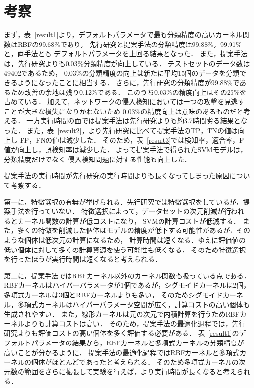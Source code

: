\section{考察}
まず，表~\ref{result1}より，デフォルトパラメータで最も分類精度の高いカーネル関数はRBFの99.68\%であり，
先行研究と提案手法の分類精度は99.88\%，99.91\%と，両手法とも
デフォルトパラメータを上回る結果となった．
また，提案手法は，先行研究よりも0.03\%分類精度が向上している．
テストセットのデータ数は49402であるため，
0.03\%の分類精度の向上は新たに平均15個のデータを分類できるようになったことに相当する．
さらに，先行研究の分類精度が99.88\%であるため改善の余地は残り0.12\%である．
このうち0.03\%の精度向上はその25\%を占めている．
加えて，ネットワークの侵入検知においては一つの攻撃を見逃すことが大きな損失になりかねないため
0.03\%の精度向上は意味のあるものだと考える．
一方実行時間の面では提案手法は先行研究よりも約3.7時間劣る結果となった．
また，表~\ref{result2}，より先行研究に比べて提案手法のTP，TNの値は向上し
FP，FNの値は減少した．
そのため，表~\ref{result3}では検知率，適合率，F値が向上し，誤検知率は減少した．
よって提案手法で得られたSVMモデルは，分類精度だけでなく
侵入検知問題に対する性能も向上した．

提案手法の実行時間が先行研究の実行時間よりも長くなってしまった原因について考察する．

第一に，特徴選択の有無が挙げられる．先行研究では特徴選択をしているが，提案手法を行っていない．
特徴選択によって，データセットの次元削減が行われるとカーネル関数の計算が低コストになり，
SVMの計算コストが低減する．
また，多くの特徴を削減した個体はモデルの精度が低下する可能性があるが，そのような個体は低次元の計算になるため，
計算時間は短くなる．ゆえに評価値の低い個体に対して多くの計算資源を使う可能性も低くなる．
そのため特徴選択を行ったほうが実行時間は短くなると考えられる．

第二に，提案手法ではRBFカーネル以外のカーネル関数も扱っている点である．
RBFカーネルはハイパーパラメータが1個であるが，シグモイドカーネルは2個，多項式カーネルは3個とRBFカーネルよりも多い，
そのためシグモイドカーネル，多項式カーネルはハイパーパラメータ空間が広く，計算コストの高い個体も生成されやすい．
また，線形カーネルは元の次元で内積計算を行うためRBFカーネルよりも計算コストは高い．
そのため，提案手法の最適化過程では，先行研究よりも評価コストの高い個体を多く評価する必要がある．
表~\ref{result1}のデフォルトパラメータの結果から，RBFカーネルと多項式カーネルの分類精度が高いことが分かるように．
提案手法の最適化過程ではRBFカーネルと多項式カーネルの個体がほとんどであったと考えられる．
そのため多項式カーネルの次元数の範囲をさらに拡張して実験を行えば，より実行時間が長くなると考えられる．


